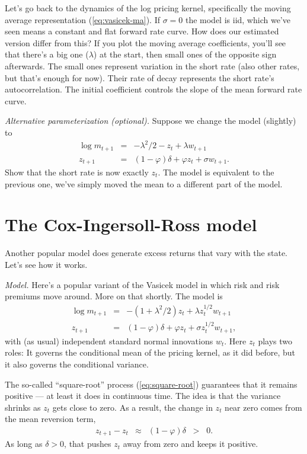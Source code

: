 \documentclass[11pt]{article}
\begin{document}
Let's go back to the dynamics of the log pricing kernel,
specifically the moving average representation (\ref{eq:vasicek-ma}).
If $\sigma = 0$ the model is iid, which we've seen means a
constant and flat forward rate curve.
How does our estimated version differ from this?
If you plot the moving average coefficients,
you'll see that there's a big one ($\lambda$) at the start,
then small ones of the opposite sign afterwards.
The small ones represent variation in the short rate
(also other rates, but that's enough for now).
Their rate of decay represents the short rate's autocorrelation.
The initial coefficient controls the slope of the mean forward rate
curve.


{\it Alternative parameterization (optional).\/}
Suppose we change the model (slightly) to
\begin{eqnarray*}
    \log m_{t+1} &=& - \lambda^2/2 - z_t + \lambda w_{t+1} \\
         z_{t+1} &=& (1-\varphi) \delta + \varphi z_t + \sigma w_{t+1} .
\end{eqnarray*}
Show that the short rate is now exactly $z_t$.
The model is equivalent to the previous one,
we've simply moved the mean to a different part of the model.


\section{The Cox-Ingersoll-Ross model}

Another popular model does generate excess returns that vary with the state.
Let's see how it works.

{\it Model.\/}
Here's a popular variant of the Vasicek model
in which risk and risk premiums move around.
More on that shortly.
The model is
\begin{eqnarray}
    \log m_{t+1} &=& - (1+\lambda^2/2 ) z_t + \lambda z_t^{1/2} w_{t+1} \nonumber \\
         z_{t+1} &=& (1-\varphi) \delta + \varphi z_t + \sigma z_t^{1/2} w_{t+1} ,
         \label{eq:square-root}
\end{eqnarray}
with (as usual) independent standard normal innovations $w_t$.
Here $z_t$ plays two roles:  It governs the conditional mean
of the pricing kernel, as it did before,
but it also governs the conditional variance.

The so-called ``square-root'' process (\ref{eq:square-root}) guarantees that
it remains positive --- at least it does in continuous time.
The idea is that the variance shrinks as $z_t$ gets close to zero.
As a result, the change in $z_t$ near zero comes from the mean reversion term,
\begin{eqnarray*}
       z_{t+1} - z_t  &\approx& (1-\varphi) \delta  \;\;>\;\; 0.
\end{eqnarray*}
As long as $\delta>0$, that pushes $z_t$ away from zero and keeps it positive.
\end{document}
